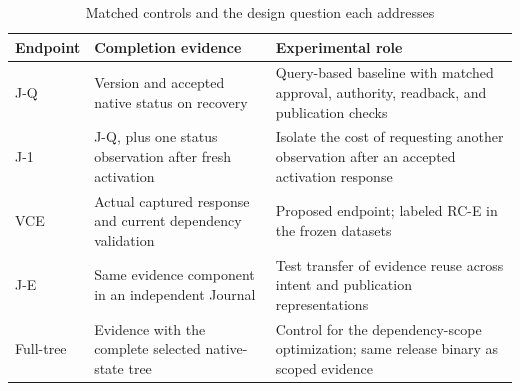 \begin{table}[!t]\centering\small
\caption{Matched controls and the design question each addresses}\label{tab:eval-controls}
\begin{tabular}{@{}>{\raggedright\arraybackslash}p{1.55cm}>{\raggedright\arraybackslash}p{5.3cm}>{\raggedright\arraybackslash}p{9cm}@{}}\toprule
Endpoint & Completion evidence & Experimental role \\\midrule
J-Q & Version and accepted native status on recovery & Query-based baseline with matched approval, authority, readback, and publication checks \\
J-1 & J-Q, plus one status observation after fresh activation & Isolate the cost of requesting another observation after an accepted activation response \\
VCE & Actual captured response and current dependency validation & Proposed endpoint; labeled RC-E in the frozen datasets \\
J-E & Same evidence component in an independent Journal & Test transfer of evidence reuse across intent and publication representations \\
Full-tree & Evidence with the complete selected native-state tree & Control for the dependency-scope optimization; same release binary as scoped evidence \\\bottomrule
\end{tabular}
\end{table}
